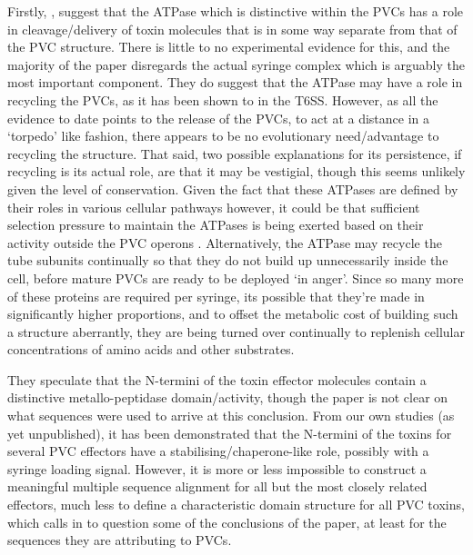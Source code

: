 Firstly, \cite{Zhang2012a}, suggest that the ATPase which is distinctive within the PVCs has a role in cleavage/delivery of toxin molecules that is in some way separate from that of the PVC structure. There is little to no experimental evidence for this, and the majority of the paper disregards the actual syringe complex which is arguably the most important component. They do suggest that the ATPase may have a role in recycling the PVCs, as it has been shown to in the T6SS. However, as all the evidence to date points to the release of the PVCs, to act at a distance in a `torpedo' like fashion, there appears to be no evolutionary need/advantage to recycling the structure. That said, two possible explanations for its persistence, if recycling is its actual role, are that it may be vestigial, though this seems unlikely given the level of conservation. Given the fact that these ATPases are defined by their roles in various cellular pathways however, it could be that sufficient selection pressure to maintain the ATPases is being exerted based on their activity outside the PVC operons \citep{Iyer2004a}. Alternatively, the ATPase may recycle the tube subunits continually so that they do not build up unnecessarily inside the cell, before mature PVCs are ready to be deployed `in anger'. Since so many more of these proteins are required per syringe, its possible that they're made in significantly higher proportions, and to offset the metabolic cost of building such a structure aberrantly, they are being turned over continually to replenish cellular concentrations of amino acids and other substrates.

They speculate that the N-termini of the toxin effector molecules contain a distinctive metallo-peptidase domain/activity, though the paper is not clear on what sequences were used to arrive at this conclusion. From our own studies (as yet unpublished), it has been demonstrated that the N-termini of the toxins for several PVC effectors have a stabilising/chaperone-like role, possibly with a syringe loading signal. However, it is more or less impossible to construct a meaningful multiple sequence alignment for all but the most closely related effectors, much less to define a characteristic domain structure for all PVC toxins, which calls in to question some of the conclusions of the paper, at least for the sequences they are attributing to PVCs.

